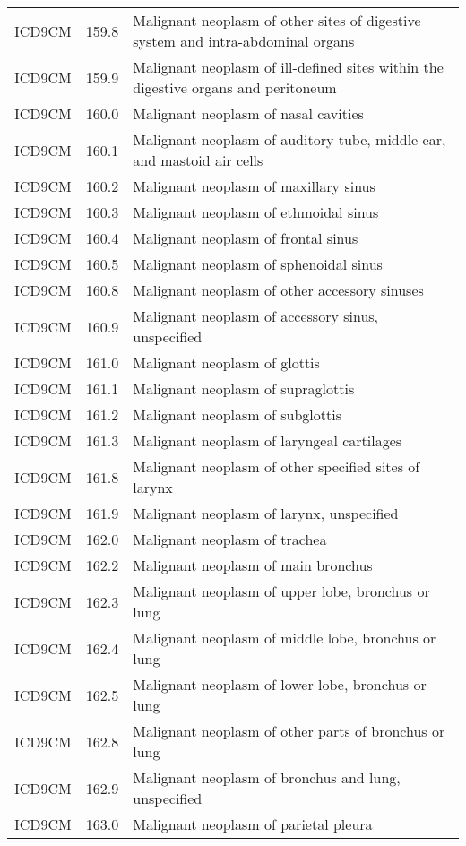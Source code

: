 \begin{longtable}{p{}p{}p{}}
  ICD9CM & 159.8 & Malignant neoplasm of other sites of digestive system and intra-abdominal organs \\ 
  ICD9CM & 159.9 & Malignant neoplasm of ill-defined sites within the digestive organs and peritoneum \\ 
  ICD9CM & 160.0 & Malignant neoplasm of nasal cavities \\ 
  ICD9CM & 160.1 & Malignant neoplasm of auditory tube, middle ear, and mastoid air cells \\ 
  ICD9CM & 160.2 & Malignant neoplasm of maxillary sinus \\ 
  ICD9CM & 160.3 & Malignant neoplasm of ethmoidal sinus \\ 
  ICD9CM & 160.4 & Malignant neoplasm of frontal sinus \\ 
  ICD9CM & 160.5 & Malignant neoplasm of sphenoidal sinus \\ 
  ICD9CM & 160.8 & Malignant neoplasm of other accessory sinuses \\ 
  ICD9CM & 160.9 & Malignant neoplasm of accessory sinus, unspecified \\ 
  ICD9CM & 161.0 & Malignant neoplasm of glottis \\ 
  ICD9CM & 161.1 & Malignant neoplasm of supraglottis \\ 
  ICD9CM & 161.2 & Malignant neoplasm of subglottis \\ 
  ICD9CM & 161.3 & Malignant neoplasm of laryngeal cartilages \\ 
  ICD9CM & 161.8 & Malignant neoplasm of other specified sites of larynx \\ 
  ICD9CM & 161.9 & Malignant neoplasm of larynx, unspecified \\ 
  ICD9CM & 162.0 & Malignant neoplasm of trachea \\ 
  ICD9CM & 162.2 & Malignant neoplasm of main bronchus \\ 
  ICD9CM & 162.3 & Malignant neoplasm of upper lobe, bronchus or lung \\ 
  ICD9CM & 162.4 & Malignant neoplasm of middle lobe, bronchus or lung \\ 
  ICD9CM & 162.5 & Malignant neoplasm of lower lobe, bronchus or lung \\ 
  ICD9CM & 162.8 & Malignant neoplasm of other parts of bronchus or lung \\ 
  ICD9CM & 162.9 & Malignant neoplasm of bronchus and lung, unspecified \\ 
  ICD9CM & 163.0 & Malignant neoplasm of parietal pleura \\ 

\end{longtable}
